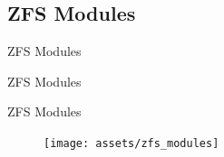 
\subsection{ZFS Modules}
\begin{frame}{ZFS Modules}
	\begin{center}
		\Huge ZFS Modules
	\end{center}	
\end{frame}

\begin{frame}[label=zfs_module_layering]{ZFS Modules}
	\begin{figure}
		\centering
		\texttt{[image: assets/zfs\_modules]}
	\end{figure}
\end{frame}


